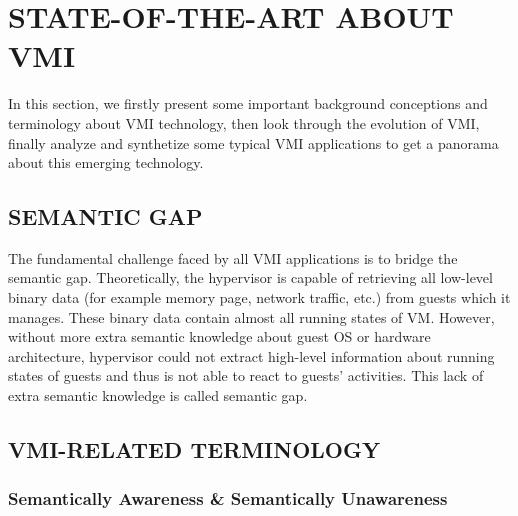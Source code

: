 
\chapter{STATE-OF-THE-ART ABOUT VMI} %

\label{Chapter2} %


In this section, we firstly present some important background conceptions and terminology about VMI technology, then look through the evolution 
of VMI, finally analyze and synthetize some typical VMI applications to get a panorama about this emerging technology.  


\section{SEMANTIC GAP \cite{Reference6}}

The fundamental challenge faced by all VMI applications is to bridge the semantic gap. Theoretically, the hypervisor is capable of 
retrieving all low-level binary data (for example memory page, network traffic, etc.) from guests which it manages. These binary data 
contain almost all running states of VM. However, without more extra semantic knowledge about guest OS or hardware architecture, 
hypervisor could not extract high-level information about running states of guests and thus is not able to react to guests’ activities.
This lack of extra semantic knowledge is called semantic gap.  


\section{VMI-RELATED TERMINOLOGY}

\subsection{Semantically Awareness \& Semantically Unawareness}

